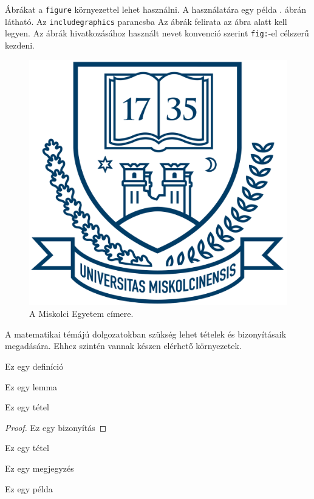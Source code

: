 
Ábrákat a \texttt{figure} környezettel lehet használni.
A használatára egy példa . ábrán látható.
Az \texttt{includegraphics} parancsba 
Az ábrák felirata az ábra alatt kell legyen.
Az ábrák hivatkozásához használt nevet konvenció szerint \texttt{fig:}-el célszerű kezdeni.

\begin{figure}[h]
\centering
\includegraphics[scale=0.3]{images/me_logo.png}
\caption{A Miskolci Egyetem címere.}
\label{fig:cimer}
\end{figure}


A matematikai témájú dolgozatokban szükség lehet tételek és bizonyításaik megadására.
Ehhez szintén vannak készen elérhető környezetek.

\begin{definition}
Ez egy definíció
\end{definition}

\begin{lemma}
Ez egy lemma
\end{lemma}

\begin{theorem}
Ez egy tétel
\end{theorem}

\begin{proof}
Ez egy bizonyítás
\end{proof}

\begin{corollary}
Ez egy tétel
\end{corollary}

\begin{remark}
Ez egy megjegyzés
\end{remark}

\begin{example}
Ez egy példa
\end{example}
